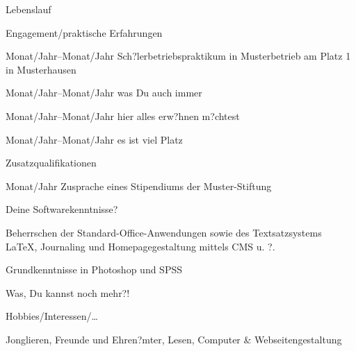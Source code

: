 \documentclass[11pt]{dinbrief}%
\begin{document}
\begin{cv}{Lebenslauf}
\begin{cvlist}{Engagement/praktische Erfahrungen}
			\item[Monat/Jahr--Monat/Jahr]Sch?lerbetriebspraktikum in Musterbetrieb am Platz 1 in Musterhausen
			\item[Monat/Jahr--Monat/Jahr]was Du auch immer 
			\item[Monat/Jahr--Monat/Jahr]hier alles erw?hnen m?chtest
			\item[Monat/Jahr--Monat/Jahr]es ist viel Platz
			\end{cvlist}
\begin{cvlist}{Zusatzqualifikationen}
			\item[Monat/Jahr]Zusprache eines Stipendiums der Muster-Stiftung 			
			\item Deine Softwarekenntnisse?
			\item Beherrschen der Standard-Office-Anwendungen sowie des Textsatzsystems \LaTeX, Journaling und Homepagegestaltung mittels CMS u. ?.
			\item Grundkenntnisse in Photoshop und SPSS
			\item Was, Du kannst noch mehr?!
		\end{cvlist}
		\begin{cvlist}{Hobbies/Interessen/\dots}
			\item Jonglieren, Freunde und Ehren?mter, Lesen, Computer \& Webseitengestaltung
		\end{cvlist}
			\date{den \today}%
	\end{cv}
\end{document}
